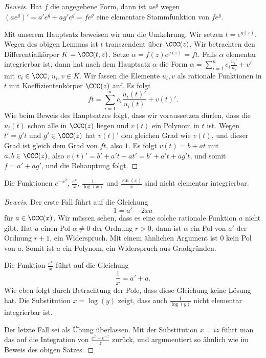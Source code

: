 \documentclass[12pt,a4paper,twoside]{article}
\begin{document}
\begin{proof}[Beweis]
  Hat $f$ die angegebene Form, dann ist $ae^g$ wegen
  $(ae^g)'=a'e^g+ag'e^g=fe^g$ eine elementare Stammfunktion von $fe^g$.
  
  Mit unserem Hauptsatz beweisen wir nun die Umkehrung. Wir setzen
  $t=e^{g(z)}$. Wegen des obigen Lemmas ist $t$ transzendent \"uber $\CCC(z)$.
  Wir betrachten den Differentialk\"orper $K=\CCC(t,z)$. Setze
  $\alpha=f(z)e^{g(z)}=ft$. Falls $\alpha$ elementar integrierbar ist, dann
  hat nach dem Hauptsatz $\alpha$ die Form
  $\alpha=\sum_{i=1}^nc_i\frac{u_i'}{u_i}+v'$ mit $c_i\in\CCC$, $u_i,v\in K$.
  Wir fassen die Elemente $u_i,v$ als rationale Funktionen in $t$ mit
  Koeffizientenk\"orper $\CCC(z)$ auf. Es folgt
\[
ft=\sum_{i=1}^nc_i\frac{u_i(t)'}{u_i(t)}+v(t)'.
\]
Wie beim Beweis des Hauptsatzes folgt, dass wir voraussetzen d\"urfen, dass
die $u_i(t)$ schon alle in $\CCC(z)$ liegen und $v(t)$ ein Polynom in $t$ ist.
Wegen $t'=g't$ und $g'\in\CCC(z)$ hat $v(t)'$ den gleichen Grad wie $v(t)$,
und dieser Grad ist gleich dem Grad von $ft$, also $1$. Es folgt $v(t)=b+at$
mit $a,b\in\CCC(z)$, also $v(t)'=b'+a't+at'=b'+a't+ag't$, und somit
$f=a'+ag'$, und die Behauptung folgt.
\end{proof}
\begin{Korollar}[Liouville]
  Die Funktionen $e^{-x^2}$, $\frac{e^x}{x}$, $\frac{1}{\log(x)}$ und
  $\frac{\sin(x)}{x}$ sind nicht elementar integrierbar.
\end{Korollar}
\begin{proof}[Beweis]
  Der erste Fall f\"uhrt auf die Gleichung
\[
1=a'-2xa
\]
f\"ur $a\in\CCC(x)$. Wir m\"ussen sehen, dass es eine solche rationale
Funktion $a$ nicht gibt. Hat $a$ einen Pol $\alpha\ne0$ der Ordnung $r>0$,
dann ist $\alpha$ ein Pol von $a'$ der Ordnung $r+1$, ein Widerspruch. Mit
einem \"ahnlichen Argument ist $0$ kein Pol von $a$. Somit ist $a$ ein
Polynom, ein Widerspruch aus Gradgr\"unden.

Die Funktion $\frac{e^x}{x}$ f\"uhrt auf die Gleichung
\[
\frac{1}{x}=a'+a.
\]
Wie eben folgt durch Betrachtung der Pole, dass diese Gleichung keine L\"osung
hat. Die Substitution $x=\log(y)$ zeigt, dass auch $\frac{1}{\log(y)}$ nicht
elementar integrierbar ist.

Der letzte Fall sei als \"Ubung \"uberlassen. Mit der Substitution $x=iz$
f\"uhrt man das auf die Integration von $\frac{e^z-e^{-z}}{z}$ zur\"uck, und
argumentiert so \"ahnlich wie im Beweis des obigen Satzes.
\end{proof}

\printindex 
%
%
%

\end{document}
